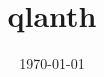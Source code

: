 \documentclass{article}
\begin{document}
\title{qlanth}
\author{}
\date{\today}
\maketitle


\end{document}
